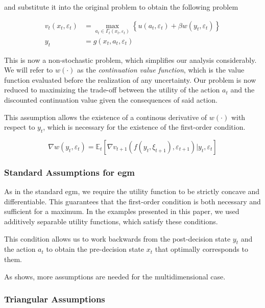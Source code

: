 \documentclass{article}
\begin{document}
and substitute it into the original problem to obtain the following problem

\begin{align}
v_t(x_t, \varepsilon_t) & = \max_{a_t \in \Gamma_t(x_t, \varepsilon_t)} \left\{ u(a_t, \varepsilon_t) + \beta w(y_t, \varepsilon_t) \right\} \\
    y_t & = g(x_t, a_t, \varepsilon_t)
\end{align}

This is now a non-stochastic problem, which simplifies our analysis considerably. We will refer to $w(\cdot)$ as the \textit{continuation value function}, which is the value function evaluated before the realization of any uncertainty. Our problem is now reduced to maximizing the trade-off between the utility of the action $a_t$ and the discounted continuation value given the consequences of said action.

This assumption allows the existence of a continous derivative of $w(\cdot)$ with respect to $y_t$, which is necessary for the existence of the first-order condition.

\begin{equation}
\nabla w(y_t, \varepsilon_t) = \mathbb{E}_t \left[ \nabla v_{t+1}(f(y_t, \xi_{t+1}), \varepsilon_{t+1}) \lvert y_t, \varepsilon_t \right]
\end{equation}

\subsubsection{Standard Assumptions for \acrshort{egm}}

As in the standard \acrshort{egm}, we require the utility function to be strictly concave and differentiable. This guarantees that the first-order condition is both necessary and sufficient for a maximum. In the examples presented in this paper, we used additively separable utility functions, which satisfy these conditions.

This condition allows us to work backwards from the post-decision state $y_t$ and the action $a_t$ to obtain the pre-decision state $x_t$ that optimally corresponds to them.

As \cite{Iskhakov2015} shows, more assumptions are needed for the multidimensional case.

\subsubsection{Triangular Assumptions}
\end{document}
